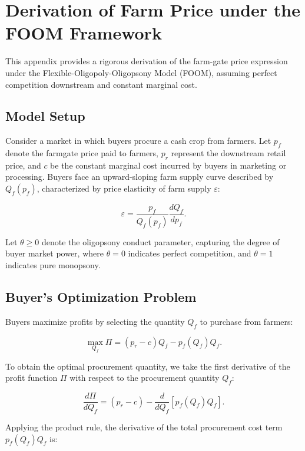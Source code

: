 \section{Derivation of Farm Price under the FOOM Framework}

This appendix provides a rigorous derivation of the farm-gate price expression under the Flexible-Oligopoly-Oligopsony Model (FOOM), assuming perfect competition downstream and constant marginal cost.

\subsection{Model Setup}

Consider a market in which buyers procure a cash crop from farmers. Let \( p_f \) denote the farmgate price paid to farmers, \( p_r \) represent the downstream retail price, and \( c \) be the constant marginal cost incurred by buyers in marketing or processing. Buyers face an upward-sloping farm supply curve described by \( Q_f(p_f) \), characterized by price elasticity of farm supply \( \varepsilon \):

\begin{equation}
\varepsilon = \frac{p_f}{Q_f(p_f)} \frac{dQ_f}{dp_f}.
\end{equation}

Let \( \theta \geq 0 \) denote the oligopsony conduct parameter, capturing the degree of buyer market power, where \( \theta = 0 \) indicates perfect competition, and \( \theta = 1 \) indicates pure monopsony.

\subsection{Buyer's Optimization Problem}

Buyers maximize profits by selecting the quantity \( Q_f \) to purchase from farmers:

\begin{equation}
\max_{Q_f} \Pi = (p_r - c)Q_f - p_f(Q_f)Q_f.
\end{equation}


To obtain the optimal procurement quantity, we take the first derivative of the profit function \(\Pi\) with respect to the procurement quantity \(Q_f\):

\[
\frac{d\Pi}{dQ_f} = (p_r - c) - \frac{d}{dQ_f}\left[p_f(Q_f)Q_f\right].
\]

Applying the product rule, the derivative of the total procurement cost term \(p_f(Q_f)Q_f\) is:

